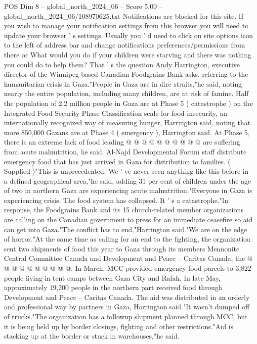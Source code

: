 \begin{textsample}{POS Dim 8 – global\_north\_2024\_06 – Score 5.00 – global\_north\_2024\_06/108970625.txt}  \label{ex:f8_pos_253}
Notifications are blocked for this site.
If you wish to manage your notification settings from this browser you will need to update your browser ' s settings.
Usually you ' d need to click on site options icon to the left of address bar and change notifications preferences/permissions from there or What would you do if your children were starving and there was nothing you could do to help them?
That ' s the question Andy Harrington, executive director of the Winnipeg-based Canadian Foodgrains Bank asks, referring to the humanitarian crisis in Gaza."People in Gaza are in dire straits,"he said, noting nearly the entire population, including many children, are at risk of famine.
Half the population of 2.2 million people in Gaza are at Phase 5 ( catastrophe ) on the Integrated Food Security Phase Classification scale for food insecurity, an internationally recognized way of measuring hunger, Harrington said, noting that more 850,000 Gazans are at Phase 4 ( emergency ), Harrington said.
At Phase 5, there is an extreme lack of food leading @ @ @ @ @ @ @ @ @ @ are suffering from acute malnutrition, he said.
Al-Najd Developmental Forum staff distribute emergency food that has just arrived in Gaza for distribution to families. ( Supplied )"This is unprecedented.
We ' ve never seen anything like this before in a defined geographical area,"he said, adding 31 per cent of children under the age of two in northern Gaza are experiencing acute malnutrition."Everyone in Gaza is experiencing crisis.
The food system has collapsed.
It ' s a catastrophe."In response, the Foodgrains Bank and its 15 church-related member organizations are calling on the Canadian government to press for an immediate ceasefire so aid can get into Gaza."The conflict has to end,"Harrington said."We are on the edge of horror."At the same time as calling for an end to the fighting, the organization sent two shipments of food this year to Gaza through its members Mennonite Central Committee Canada and Development and Peace -- Caritas Canada, the @ @ @ @ @ @ @ @ @ @.
In March, MCC provided emergency food parcels to 3,822 people living in tent camps between Gaza City and Rafah.
In late May, approximately 19,200 people in the northern part received food through Development and Peace -- Caritas Canada.
The aid was distributed in an orderly and professional way by partners in Gaza, Harrington said."It wasn't dumped off of trucks."The organization has a followup shipment planned through MCC, but it is being held up by border closings, fighting and other restrictions."Aid is stacking up at the border or stuck in warehouses,"he said.

\end{textsample}
